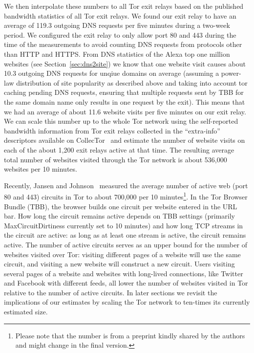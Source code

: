 We then interpolate these numbers to all Tor exit relays based on the published
bandwidth statistics of all Tor exit relays. We found our exit relay to have an
average of 119.3 outgoing DNS requests per five minutes during a two-week period.
We configured the exit relay to only allow port 80 and 443 during the time
of the measurements to avoid counting DNS requests from protocols other than
HTTP and HTTPS.
From DNS statistics of the Alexa top one million websites (see
Section~\ref{sec:dns2site}) we know that one website visit causes about
10.3 outgoing DNS requests for unqiue domains on average
(assuming a power-law distribution of site popularity as described above and
taking into account tor caching pending DNS requests, ensuring that multiple
requests sent by TBB for the same domain name only results in one request
by the exit).
This means that we had an average of about 11.6 website visits per five
minutes on our exit relay. We can scale this number up to the whole Tor
network using the self-reported bandwidth information from Tor exit
relays collected in the ``extra-info'' descriptors available on
CollecTor~\cite{collector} and estimate the number of website visits on
each of the about 1,200 exit relays active at that time. The resulting average
total number of websites visited through the Tor network is about 536,000
websites per 10 minutes.

Recently, Jansen and Johnson~\cite{jansen-ccs2016} measured the average
number of active web (port 80 and 443) circuits in Tor to about 700,000 per 10
minutes\footnote{Please note that the number is from a preprint kindly
shared by the authors and might change in the final version.}.
In the Tor Browser Bundle (TBB), the browser builds one circuit per
website entered in the URL bar. How long the circuit remains active depends on
TBB settings (primarily MaxCircuitDirtiness currently set to 10 minutes) and how
long TCP streams in the circuit are active: as long as at least one stream is
active, the circuit remains active. The number of active circuits serves as an
upper bound for the number of websites visited over Tor: visiting different
pages of a website will use the same circuit, and visiting a new website will
construct a new circuit. Users visiting several pages of a website and websites
with long-lived connections, like Twitter and Facebook with different feeds,
all lower the number of websites visited in Tor relative to the number of active
circuits. In later sections we revisit the implications of our estimates by
scaling the Tor network to ten-times its currently estimated size.

